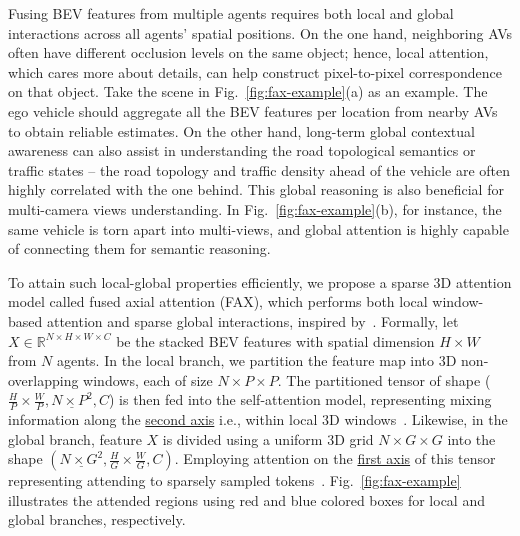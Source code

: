 \documentclass{article}
\begin{document}
%
%
%
Fusing BEV features from multiple agents requires both local and global interactions across all agents' spatial positions.
%
On the one hand, neighboring AVs often have different occlusion levels on the same object; hence, local attention, which cares more about details, can help construct pixel-to-pixel correspondence on that object.
%
Take the scene in Fig.~\ref{fig:fax-example}(a) as an example. The ego vehicle should aggregate all the BEV features per location from nearby AVs to obtain reliable estimates.
%
On the other hand, long-term global contextual awareness can also assist in understanding the road topological semantics or traffic states -- the road topology and traffic density ahead of the vehicle are often highly correlated with the one behind. %
%
This global reasoning is also beneficial for multi-camera views understanding.
%
In Fig.~\ref{fig:fax-example}(b), for instance, the same vehicle is torn apart into multi-views, and global attention is highly capable of connecting them for semantic reasoning. 

%
To attain such local-global properties efficiently, we propose a sparse 3D attention model called fused axial attention (FAX), which performs both local window-based attention and sparse global interactions, inspired by~\cite{liu2021video,huang2021shuffle,tu2022maxvit}.
%
Formally, let $X\in \mathbb{R}^{N\times H\times W\times C}$ be the stacked BEV features with spatial dimension $H\times W$ from $N$ agents.
%
In the local branch, we partition the feature map into 3D non-overlapping windows, each of size $N\times P\times P$.
%
The partitioned tensor of shape ($\frac{H}{P}\times\frac{W}{P},\underline{N\times P^2},C$) is then fed into the self-attention model, representing mixing information along the \underline{second axis} i.e., within local 3D windows~\cite{liu2021video}.
%
Likewise, in the global branch, feature $X$ is divided using a uniform 3D grid $N\times G\times G$ into the shape $(\underline{N\times G^2},\frac{H}{G}\times\frac{W}{G},C)$.
%
Employing attention on the \underline{first axis} of this tensor representing attending to sparsely sampled tokens~\cite{huang2021shuffle,tu2022maxvit}.
%
Fig.~\ref{fig:fax-example} illustrates the attended regions using red and blue colored boxes for local and global branches, respectively.
%
\end{document}
